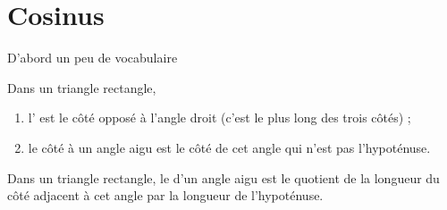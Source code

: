 


\section{Cosinus}

D'abord un peu de vocabulaire

\begin{definition}
Dans un triangle rectangle,
\begin{enumerate}
    \item
        l' est le côté opposé à l'angle droit (c'est le plus long des trois côtés) ;
\item
    le côté  à un angle aigu est le côté de cet angle qui n'est pas l'hypoténuse.
\end{enumerate}
\end{definition}


\begin{definition}
    Dans un triangle rectangle, le  d'un angle aigu est le quotient de la longueur du côté adjacent à cet angle par la longueur de l'hypoténuse.
\end{definition}
